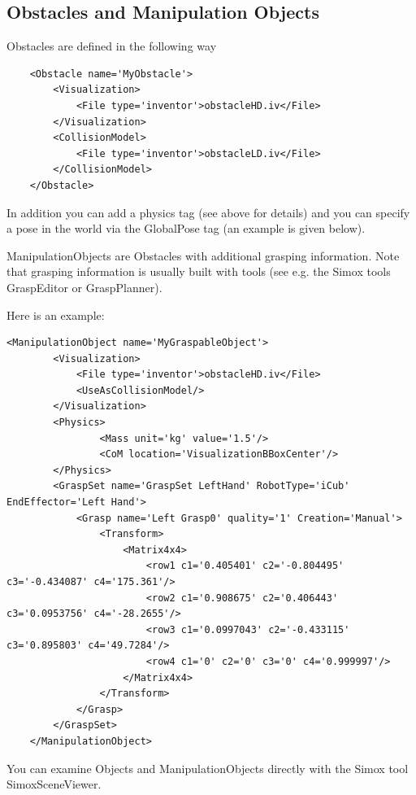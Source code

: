 \subsection{Obstacles and Manipulation Objects}
Obstacles are defined in the following way
\begin{lstlisting}
    <Obstacle name='MyObstacle'>
        <Visualization>
            <File type='inventor'>obstacleHD.iv</File>
        </Visualization>
        <CollisionModel>
            <File type='inventor'>obstacleLD.iv</File>
        </CollisionModel>
    </Obstacle>
\end{lstlisting}
In addition you can add a physics tag (see above for details) and you can specify a pose in the world via the GlobalPose tag (an example is given below).
\par
ManipulationObjects are Obstacles with additional grasping information. Note that grasping information is usually built with tools (see e.g. the Simox tools GraspEditor or GraspPlanner).
\par
Here is an example:
\begin{lstlisting}
<ManipulationObject name='MyGraspableObject'>
        <Visualization>
            <File type='inventor'>obstacleHD.iv</File>
            <UseAsCollisionModel/>
        </Visualization>
        <Physics>
                <Mass unit='kg' value='1.5'/>
                <CoM location='VisualizationBBoxCenter'/>
        </Physics>
        <GraspSet name='GraspSet LeftHand' RobotType='iCub' EndEffector='Left Hand'>
            <Grasp name='Left Grasp0' quality='1' Creation='Manual'>
                <Transform>
                    <Matrix4x4>
                        <row1 c1='0.405401' c2='-0.804495' c3='-0.434087' c4='175.361'/>
                        <row2 c1='0.908675' c2='0.406443' c3='0.0953756' c4='-28.2655'/>
                        <row3 c1='0.0997043' c2='-0.433115' c3='0.895803' c4='49.7284'/>
                        <row4 c1='0' c2='0' c3='0' c4='0.999997'/>
                    </Matrix4x4>
                </Transform>
            </Grasp>
        </GraspSet>
    </ManipulationObject>
\end{lstlisting}
You can examine Objects and ManipulationObjects directly with the Simox tool SimoxSceneViewer.
